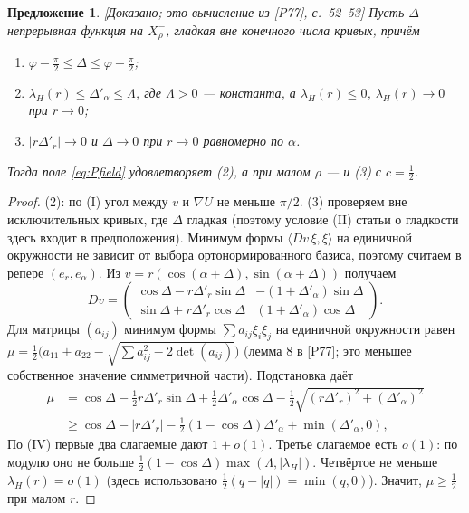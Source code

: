 \documentclass[11pt,a4paper]{article}
\newtheorem{proposition}[theorem]{Предложение}
\theoremstyle{definition}
\newcommand{\mk}[1]{\textsf{[#1]}}
\begin{document}
\begin{proposition}\label{prop:rotated}
\mk{Доказано; это вычисление из [P77], с.~52--53} Пусть $\Delta$ --- непрерывная функция на
$X^-_\rho$, гладкая вне конечного числа кривых, причём
\begin{enumerate}[label=(\Roman*)]
\item $\varphi-\tfrac\pi2\le\Delta\le\varphi+\tfrac\pi2$;
\item[(III)] $\lambda_H(r)\le\Delta'_\alpha\le\Lambda$, где $\Lambda>0$ --- константа, а $\lambda_H(r)\le0$,
$\lambda_H(r)\to0$ при $r\to0$;
\item[(IV)] $|r\Delta'_r|\to0$ и $\Delta\to0$ при $r\to0$ равномерно по $\alpha$.
\end{enumerate}
Тогда поле \eqref{eq:Pfield} удовлетворяет (2), а при малом $\rho$ --- и (3) с $c=\tfrac12$.
\end{proposition}
\begin{proof}
(2): по (I) угол между $v$ и $\nabla U$ не меньше $\pi/2$. (3) проверяем вне исключительных кривых,
где $\Delta$ гладкая (поэтому условие (II) статьи о гладкости здесь входит в предположения). Минимум
формы $\langle Dv\,\xi,\xi\rangle$ на единичной окружности не зависит от выбора ортонормированного
базиса, поэтому считаем в репере $(e_r,e_\alpha)$. Из $v=r(\cos(\alpha+\Delta),\sin(\alpha+\Delta))$ получаем
\[
Dv=\begin{pmatrix}\cos\Delta-r\Delta'_r\sin\Delta & -(1+\Delta'_\alpha)\sin\Delta\\
\sin\Delta+r\Delta'_r\cos\Delta & (1+\Delta'_\alpha)\cos\Delta\end{pmatrix}.
\]
Для матрицы $(a_{ij})$ минимум формы $\sum a_{ij}\xi_i\xi_j$ на единичной окружности равен
$\mu=\tfrac12\bigl(a_{11}+a_{22}-\sqrt{\sum a_{ij}^2-2\det(a_{ij})}\bigr)$ (лемма 8 в [P77]; это меньшее
собственное значение симметричной части). Подстановка даёт
\begin{align*}
\mu&=\cos\Delta-\tfrac12r\Delta'_r\sin\Delta+\tfrac12\Delta'_\alpha\cos\Delta-\tfrac12\sqrt{(r\Delta'_r)^2+(\Delta'_\alpha)^2}\\
&\ge\cos\Delta-|r\Delta'_r|-\tfrac12(1-\cos\Delta)\Delta'_\alpha+\min(\Delta'_\alpha,0),
\end{align*}
По (IV) первые два слагаемые дают $1+o(1)$. Третье слагаемое есть $o(1)$: по модулю оно не
больше $\tfrac12(1-\cos\Delta)\max(\Lambda,|\lambda_H|)$. Четвёртое не меньше $\lambda_H(r)=o(1)$ (здесь
использовано $\tfrac12(q-|q|)=\min(q,0)$).
Значит, $\mu\ge\tfrac12$ при малом $r$.
\end{proof}
\end{document}
